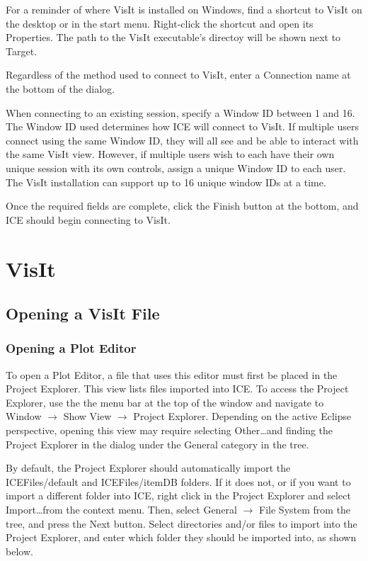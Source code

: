 For a reminder of where VisIt is installed on Windows, find a shortcut to
VisIt on the desktop or in the start menu. Right-click the shortcut and open its
Properties. The path to the VisIt executable's directoy will be shown next to
Target.

Regardless of the method used to connect to VisIt, enter a Connection
name at the bottom of the dialog. 

When connecting to an existing session, specify a Window ID between 1 and 16.
The Window ID used determines how ICE will connect to VisIt. If multiple users
connect using the same Window ID, they will all see and be able to interact with
the same VisIt view. However, if multiple users wish to each have their own
unique session with its own controls, assign a unique Window ID to each user.
The VisIt installation can support up to 16 unique window IDs at a time.

Once the required fields are complete, click the Finish button at the bottom,
and ICE should begin connecting to VisIt.

\section{VisIt}

\subsection{Opening a VisIt File}

\subsubsection{Opening a Plot Editor} 

To open a Plot Editor, a file that uses this editor must first be placed in the
Project Explorer. This view lists files imported into ICE. To access the Project
Explorer, use the the menu bar at the top of the window and navigate to Window
$\rightarrow$ Show View $\rightarrow$ Project Explorer. Depending on the active
Eclipse perspective, opening this view may require selecting Other\ldots and
finding the Project Explorer in the dialog under the General category in the
tree.

By default, the Project Explorer should automatically import the
ICEFiles/default and ICEFiles/itemDB folders. If it does not, or if you want to
import a different folder into ICE, right click in the Project Explorer and
select Import\ldots from the context menu. Then, select General $\rightarrow$
File System from the tree, and press the Next button. Select directories and/or
files to import into the Project Explorer, and enter which folder they should
be imported into, as shown below.


